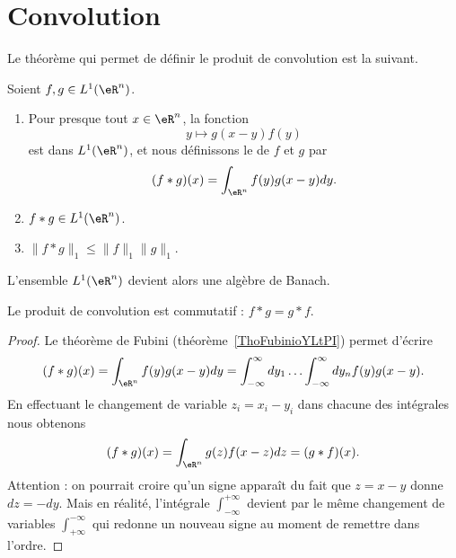 \section{Convolution}

Le théorème qui permet de définir le produit de convolution est la suivant.

\begin{theoremDef}     \label{THOooMLNMooQfksn}
    Soient \( f,g\in L^1(\eR^n)\).
    \begin{enumerate}
        \item
            Pour presque tout \( x\in \eR^n\), la fonction
            \begin{equation}
                y\mapsto g(x-y)f(y)
            \end{equation}
            est dans \( L^1(\eR^n)\), et nous définissons le  de \( f\) et \( g\) par
            \begin{equation}
                (f*g)(x)=\int_{\eR^n} f(y)g(x-y)dy.
            \end{equation}
        \item
            \( f*g\in L^1(\eR^n)\).
        \item
            \( \| f*g \|_1\leq \| f \|_1\| g \|_1\).
    \end{enumerate}
\end{theoremDef}

L'ensemble \( L^1(\eR^n)\) devient alors une algèbre de Banach.

\begin{lemma}
    Le produit de convolution est commutatif : \( f*g=g*f\).
\end{lemma}

\begin{proof}
    Le théorème de Fubini (théorème~\ref{ThoFubinioYLtPI}) permet d'écrire
    \begin{equation}
        (f*g)(x)=\int_{\eR^n}f(y)g(x-y)dy=\int_{-\infty}^{\infty}dy_1\ldots \int_{-\infty}^{\infty}dy_nf(y)g(x-y).
    \end{equation}
    En effectuant le changement de variable \( z_i=x_i-y_i\) dans chacune des intégrales nous obtenons
    \begin{equation}
        (f*g)(x)=\int_{\eR^n}g(z)f(x-z)dz=(g*f)(x).
    \end{equation}
    Attention : on pourrait croire qu'un signe apparaît du fait que \( z=x-y\) donne \( dz=-dy\). Mais en réalité, l'intégrale \( \int_{-\infty}^{+\infty}\) devient par le même changement de variables \( \int_{+\infty}^{-\infty}\) qui redonne un nouveau signe au moment de remettre dans l'ordre.
\end{proof}

